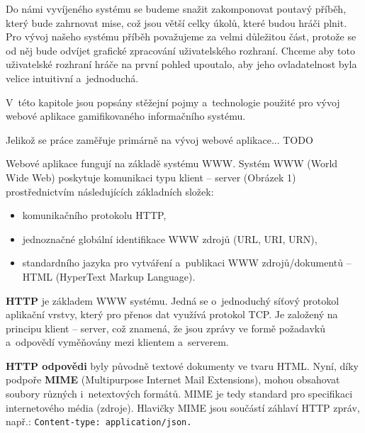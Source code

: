 \documentclass[12pt]{article}
\begin{document}
\par
Do námi vyvíjeného systému se budeme snažit zakomponovat poutavý příběh,
který bude zahrnovat mise, což jsou větší celky úkolů, které budou hráči plnit.
Pro vývoj našeho systému příběh považujeme za velmi důležitou část,
protože se od něj bude odvíjet grafické zpracování uživatelského rozhraní. 
Chceme aby toto uživatelské rozhraní hráče na první pohled upoutalo,
aby jeho ovladatelnost byla velice intuitivní a~jednoduchá.

\par


V~této kapitole jsou popsány stěžejní pojmy a~technologie použité pro vývoj webové aplikace
gamifikovaného informačního systému. 

Jelikož se práce zaměřuje primárně na vývoj webové aplikace... TODO

Webové aplikace fungují na základě systému WWW. 
Systém WWW (World Wide Web) poskytuje komunikaci typu klient -- server (Obrázek 1)
prostřednictvím následujících základních složek:

\begin{itemize}
\item komunikačního protokolu HTTP, 
\item jednoznačné globální identifikace WWW zdrojů (URL, URI, URN),
\item standardního jazyka pro vytváření a~publikaci WWW zdrojů/dokumentů -- HTML
(HyperText Markup Language).
\end{itemize}

\obrazek
{}

\textbf{HTTP} je základem  WWW systému. 
Jedná se o~jednoduchý síťový protokol aplikační vrstvy, 
který pro přenos dat využívá protokol TCP. 
Je založený na principu klient -- server, 
což znamená, že jsou zprávy ve formě požadavků a~odpovědí vyměňovány mezi klientem 
a~serverem. 

\textbf{HTTP odpovědi} byly původně textové dokumenty ve tvaru HTML.
Nyní, díky podpoře \textbf{MIME} (Multipurpose Internet Mail Extensions),
mohou obsahovat soubory různých i~netextových formátů.
MIME je tedy standard pro specifikaci internetového média (zdroje).
Hlavičky MIME jsou součástí záhlaví HTTP zpráv, např.: \texttt{Content-type:~application/json.} 
\end{document}
